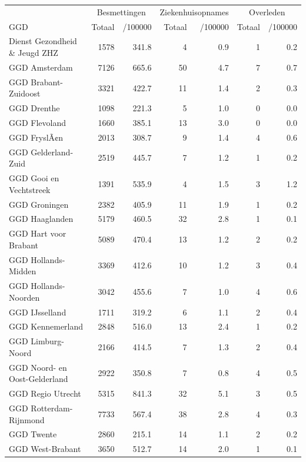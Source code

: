 \documentclass[
  english,
  man,floatsintext]{apa6}
\begin{document}
\begin{table}
\centering\begingroup\fontsize{10}{12}\selectfont

\begin{threeparttable}
\begin{tabular}{lrrrrrr}
\toprule
\multicolumn{1}{c}{ } & \multicolumn{2}{c}{Besmettingen} & \multicolumn{2}{c}{Ziekenhuisopnames} & \multicolumn{2}{c}{Overleden} \\
\cmidrule(l{3pt}r{3pt}){2-3} \cmidrule(l{3pt}r{3pt}){4-5} \cmidrule(l{3pt}r{3pt}){6-7}
GGD & Totaal & /100000 & Totaal & /100000 & Totaal & /100000\\
\midrule
Dienst Gezondheid \& Jeugd ZHZ & 1578 & 341.8 & 4 & 0.9 & 1 & 0.2\\
GGD Amsterdam & 7126 & 665.6 & 50 & 4.7 & 7 & 0.7\\
GGD Brabant-Zuidoost & 3321 & 422.7 & 11 & 1.4 & 2 & 0.3\\
GGD Drenthe & 1098 & 221.3 & 5 & 1.0 & 0 & 0.0\\
GGD Flevoland & 1660 & 385.1 & 13 & 3.0 & 0 & 0.0\\
GGD FryslÃ¢n & 2013 & 308.7 & 9 & 1.4 & 4 & 0.6\\
GGD Gelderland-Zuid & 2519 & 445.7 & 7 & 1.2 & 1 & 0.2\\
GGD Gooi en Vechtstreek & 1391 & 535.9 & 4 & 1.5 & 3 & 1.2\\
GGD Groningen & 2382 & 405.9 & 11 & 1.9 & 1 & 0.2\\
GGD Haaglanden & 5179 & 460.5 & 32 & 2.8 & 1 & 0.1\\
GGD Hart voor Brabant & 5089 & 470.4 & 13 & 1.2 & 2 & 0.2\\
GGD Hollands-Midden & 3369 & 412.6 & 10 & 1.2 & 3 & 0.4\\
GGD Hollands-Noorden & 3042 & 455.6 & 7 & 1.0 & 4 & 0.6\\
GGD IJsselland & 1711 & 319.2 & 6 & 1.1 & 2 & 0.4\\
GGD Kennemerland & 2848 & 516.0 & 13 & 2.4 & 1 & 0.2\\
GGD Limburg-Noord & 2166 & 414.5 & 7 & 1.3 & 2 & 0.4\\
GGD Noord- en Oost-Gelderland & 2922 & 350.8 & 7 & 0.8 & 4 & 0.5\\
GGD Regio Utrecht & 5315 & 841.3 & 32 & 5.1 & 3 & 0.5\\
GGD Rotterdam-Rijnmond & 7733 & 567.4 & 38 & 2.8 & 4 & 0.3\\
GGD Twente & 2860 & 215.1 & 14 & 1.1 & 2 & 0.2\\
GGD West-Brabant & 3650 & 512.7 & 14 & 2.0 & 1 & 0.1\\

\end{tabular}
\end{threeparttable}
\end{table}
\end{document}

